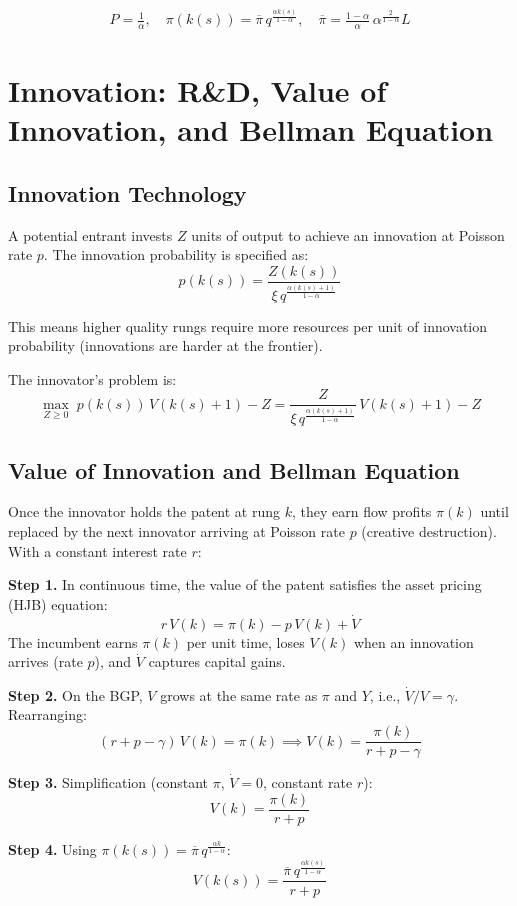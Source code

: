 \documentclass[a4paper,11pt]{article}
\newcommand{\pibar}{\overline{\pi}}
\begin{document}
\begin{resultbox}
\begin{align*}
\boxed{P = \frac{1}{\alpha}, \quad \pi(k(s)) = \pibar\, q^{\frac{\alpha k(s)}{1-\alpha}}, \quad \pibar = \frac{1-\alpha}{\alpha}\,\alpha^{\frac{2}{1-\alpha}} L}
\tag{Monopoly}
\end{align*}
\end{resultbox}

\clearpage

\section{Innovation: R\&D, Value of Innovation, and Bellman Equation}

\subsection*{Innovation Technology}

A potential entrant invests $Z$ units of output to achieve an innovation at Poisson rate $p$. The innovation probability is specified as:
\[
p(k(s)) = \frac{Z(k(s))}{\xi\, q^{\frac{\alpha(k(s)+1)}{1-\alpha}}}
\]

This means higher quality rungs require more resources per unit of innovation probability (innovations are harder at the frontier).

The innovator's problem is:
\[
\max_{Z \geq 0} \; p(k(s))\, V(k(s)+1) - Z = \frac{Z}{\xi\, q^{\frac{\alpha(k(s)+1)}{1-\alpha}}}\, V(k(s)+1) - Z
\]

\subsection*{Value of Innovation and Bellman Equation}

Once the innovator holds the patent at rung $k$, they earn flow profits $\pi(k)$ until replaced by the next innovator arriving at Poisson rate $p$ (creative destruction). With a constant interest rate $r$:

\begin{derivationbox}[title={Derivation: Value Function (Bellman Equation)}]
\textbf{Step 1.} In continuous time, the value of the patent satisfies the asset pricing (HJB) equation:
\[
r\,V(k) = \pi(k) - p\, V(k) + \dot{V}
\]
The incumbent earns $\pi(k)$ per unit time, loses $V(k)$ when an innovation arrives (rate $p$), and $\dot{V}$ captures capital gains.

\textbf{Step 2.} On the BGP, $V$ grows at the same rate as $\pi$ and $Y$, i.e., $\dot{V}/V = \gamma$. Rearranging:
\[
(r + p - \gamma)\, V(k) = \pi(k) \implies V(k) = \frac{\pi(k)}{r + p - \gamma}
\]

\textbf{Step 3.} Simplification (constant $\pi$, $\dot{V}=0$, constant rate $r$):
\[
V(k) = \frac{\pi(k)}{r + p}
\]

\textbf{Step 4.} Using $\pi(k(s)) = \pibar\, q^{\frac{\alpha k}{1-\alpha}}$:
\[
V(k(s)) = \frac{\pibar\, q^{\frac{\alpha k(s)}{1-\alpha}}}{r + p}
\]
\end{derivationbox}
\end{document}
